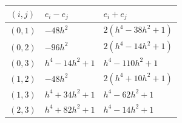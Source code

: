 \begin{center}\small
\begin{tabular}{cll}
\toprule
$(i,j)$ & $e_i-e_j$ & $e_i+e_j$\\
\midrule
$(0,1)$ & $- 48 h^{2}$ & $2 \left(h^{4} - 38 h^{2} + 1\right)$\\
$(0,2)$ & $- 96 h^{2}$ & $2 \left(h^{4} - 14 h^{2} + 1\right)$\\
$(0,3)$ & $h^{4} - 14 h^{2} + 1$ & $h^{4} - 110 h^{2} + 1$\\
$(1,2)$ & $- 48 h^{2}$ & $2 \left(h^{4} + 10 h^{2} + 1\right)$\\
$(1,3)$ & $h^{4} + 34 h^{2} + 1$ & $h^{4} - 62 h^{2} + 1$\\
$(2,3)$ & $h^{4} + 82 h^{2} + 1$ & $h^{4} - 14 h^{2} + 1$\\
\bottomrule
\end{tabular}
\end{center}
